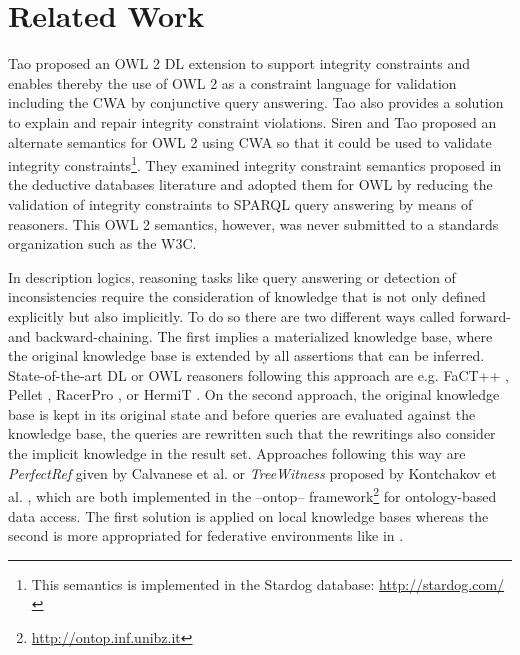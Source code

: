 \documentclass{llncs}
\begin{document}
\section{Related Work}
\label{sec:related-Work}

Tao \cite{tao2012integrity} proposed an OWL 2 DL extension to support integrity constraints and enables thereby the use of OWL 2 as a constraint language for validation including the CWA by conjunctive query answering. Tao also provides a solution to explain and repair integrity constraint violations.
Siren and Tao proposed an alternate semantics for OWL 2 using CWA so that it could be used to validate integrity constraints\footnote{This semantics is implemented in the Stardog database: \url{http://stardog.com/}}\cite{SirinTao2009}. 
They examined integrity constraint semantics proposed in the deductive databases literature and adopted them for OWL
by reducing the validation of integrity constraints to SPARQL query answering by means of reasoners.
This OWL 2 semantics, however, was never submitted to a standards organization such as the W3C.

In description logics, reasoning tasks like query answering or detection of inconsistencies require the consideration of knowledge that is not only defined explicitly but also implicitly. To do so there are two different ways called forward- and backward-chaining. The first implies a materialized knowledge base, where the original knowledge base is extended by all assertions that can be inferred. State-of-the-art DL or OWL reasoners following this approach are e.g. FaCT++ \cite{tsarkov2006fact++}, Pellet \cite{sirin2007pellet},  RacerPro \cite{haarslev2001racer}, or HermiT \cite{horrocks2012hermit}. 
On the second approach, the original knowledge base is kept in its original state and before queries are evaluated against the knowledge base, the queries are rewritten such that the rewritings also consider the implicit knowledge in the result set. 
Approaches following this way are \emph{PerfectRef} given by Calvanese et al. \cite{Calvanese2007} or \emph{TreeWitness} proposed by Kontchakov et al. \cite{kontchakov2011combined}, which are both implemented in the --ontop-- framework\footnote{\url{http://ontop.inf.unibz.it}} for ontology-based data access. 
The first solution is applied on local knowledge bases whereas the second is more appropriated for federative environments like in \cite{nolle2014efficient,nolle2013elite}. 
\end{document}

